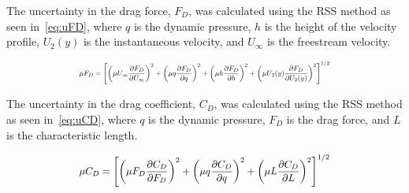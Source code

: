 \documentclass[journal,letterpaper]{IEEEtran}
\begin{document}
The uncertainty in the drag force, $F_D$, was calculated using the RSS method as seen in~\eqref{eq:uFD}, where $q$ is the dynamic pressure, $h$ is the height of the velocity profile, $U_2 (y)$ is the instantaneous velocity, and $U_\infty$ is the freestream velocity.

\begin{equation} \label{eq:uFD}
    \resizebox{227pt}{!}{$\displaystyle{\mu F_D = \left[\left(\mu U_\infty \frac{\partial F_D}{\partial U_\infty}\right)^2 + \left(\mu q \frac{\partial F_D}{\partial q}\right)^2 + \left(\mu h \frac{\partial F_D}{\partial h}\right)^2 + \left(\mu U_2 (y) \frac{\partial F_D}{\partial U_2 (y)}\right)^2\right]^{1/2}}$}
\end{equation}

The uncertainty in the drag coefficient, $C_D$, was calculated using the RSS method as seen in~\eqref{eq:uCD}, where $q$ is the dynamic pressure, $F_D$ is the drag force, and $L$ is the characteristic length.

\begin{equation} \label{eq:uCD}
    \resizebox{227pt}{!}{$\displaystyle{\mu C_D = \left[\left(\mu F_D \frac{\partial C_D}{\partial F_D}\right)^2 + \left(\mu q \frac{\partial C_D}{\partial q}\right)^2 + \left(\mu L \frac{\partial C_D}{\partial L}\right)^2\right]^{1/2}}$}
\end{equation}
\end{document}
